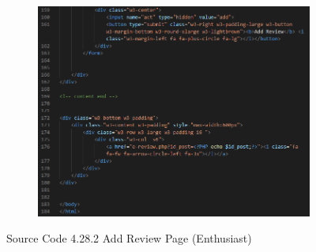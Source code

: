 \begin{enumerate}[1.]
\begin{figure}[h]
\begin{subfigure}[b]{0.9\textwidth}
            \includegraphics[width=\textwidth]{mainmatter/images/frontend/code/eaddreview3.png}
            \label{fig:sub3}
        \end{subfigure}
        \caption*{Source Code 4.28.2 Add Review Page (Enthusiast)}
        \label{fig:myfig67b}
    \end{figure}
    \clearpage


\end{enumerate}
